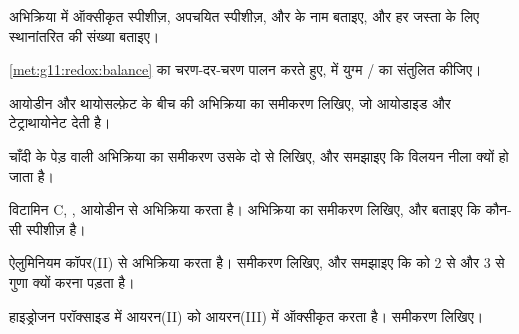 \begin{exercise}[$\star$]\label{exo:g11:redox:5}
अभिक्रिया  में ऑक्सीकृत स्पीशीज़,
अपचयित स्पीशीज़,  और  के नाम बताइए, और
हर जस्ता  के लिए स्थानांतरित  की संख्या बताइए।
\end{exercise}

\begin{exercise}[$\star\star$]\label{exo:g11:redox:6}
\cref{met:g11:redox:balance} का चरण-दर-चरण पालन करते हुए,  में
युग्म / का 
संतुलित कीजिए।
\end{exercise}

\begin{exercise}[$\star\star$]\label{exo:g11:redox:7}
आयोडीन  और
थायोसल्फ़ेट   के बीच की अभिक्रिया का समीकरण लिखिए, जो आयोडाइड  और
टेट्राथायोनेट   देती है।
\end{exercise}

\begin{exercise}[$\star\star$]\label{exo:g11:redox:8}
चाँदी के पेड़ वाली अभिक्रिया का समीकरण उसके दो
 से लिखिए, और समझाइए कि विलयन नीला क्यों हो जाता है।
\end{exercise}

\begin{exercise}[$\star\star$]\label{exo:g11:redox:9}
विटामिन C, , आयोडीन  से अभिक्रिया करता है। अभिक्रिया का
समीकरण लिखिए, और बताइए कि कौन-सी स्पीशीज़  है।
\end{exercise}

\begin{exercise}[$\star\star$]\label{exo:g11:redox:10}
ऐलुमिनियम कॉपर(II)  से अभिक्रिया करता है। समीकरण लिखिए, और समझाइए
कि  को 2 से और 3 से गुणा क्यों करना पड़ता है।
\end{exercise}

\begin{exercise}[$\star\star$]\label{exo:g11:redox:11}
हाइड्रोजन परॉक्साइड  में आयरन(II)  को आयरन(III)  में
ऑक्सीकृत करता है। समीकरण लिखिए।
\end{exercise}

